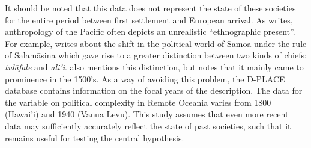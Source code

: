 \documentclass[12pt,letterpaper]{article}
\begin{document}



It should be noted that this data does not represent the state of these societies for the entire period between first settlement and European arrival. As \citet{meleisea1995} writes, anthropology of the Pacific often depicts an unrealistic ``ethnographic present''. For example, \citet[185]{schoeffel87} writes about the shift in the political world of S\={a}moa under the rule of Salam\={a}sina which gave rise to a greater distinction between two kinds of chiefs: \emph{tul\={a}fale} and \emph{ali'i}. \citet[249]{kirch2017road} also mentions this distinction, but notes that it mainly came to prominence in the 1500's. As a way of avoiding this problem, the D-PLACE database \citep{d_place_all} contains information on the focal years of the description. The data for the variable on political complexity in Remote Oceania varies from 1800 (Hawai'i) and 1940 (Vanua Levu). This study assumes that even more recent data may sufficiently accurately reflect the state of past societies, such that it remains useful for testing the central hypothesis.
\end{document}
